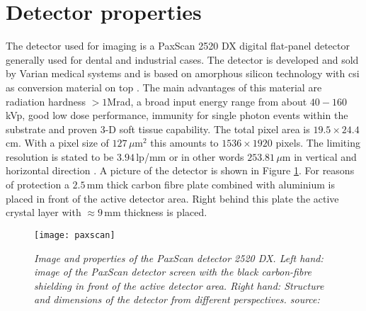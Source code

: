 \section{Detector properties}
The detector used for imaging is a PaxScan 2520 DX digital flat-panel detector generally used for dental and industrial cases. The detector is developed and sold by Varian medical systems and is based on amorphous silicon technology with \gls{csi} as conversion material on top \citep{Paxscan}. The main advantages of this material are radiation hardness $> 1$Mrad, a broad input energy range from about $40 - 160\,$kVp, good low dose performance, immunity for single photon events within the substrate and proven 3-D soft tissue capability. The total pixel area is $19.5\times 24.4\,$cm. With a pixel size of $127\, \mu\text{m}^{2}$ this amounts to $1536 \times 1920$ pixels. The limiting resolution is stated to be $3.94\,$lp/mm or in other words $253.81\, \mu$m in vertical and horizontal direction \citep{Paxscan}. A picture of the detector is shown in Figure \ref{paxscan}. For reasons of protection a $2.5\,$mm thick carbon fibre plate combined with aluminium is placed in front of the active detector area. Right behind this plate the active crystal layer with $\approx 9\,$mm thickness is placed.    
\begin{figure}[h]
	\begin{center}
		\texttt{[image: paxscan]}
	\end{center}
	\caption[Varian detector properties]{\textit{Image and properties of the PaxScan detector 2520 DX. Left hand: image of the PaxScan detector screen with the black carbon-fibre shielding in front of the active detector area. Right hand: Structure and dimensions of the detector from different perspectives. source: \citep{Paxscan} }}
	\label{paxscan}
\end{figure}

















